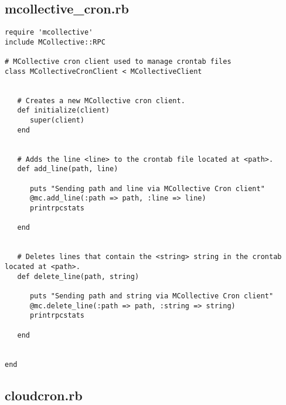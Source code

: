 \subsection{mcollective\_cron.rb}


\begin{lstlisting}
require 'mcollective'
include MCollective::RPC

# MCollective cron client used to manage crontab files
class MCollectiveCronClient < MCollectiveClient
   
   
   # Creates a new MCollective cron client.
   def initialize(client)
      super(client)
   end
   
   
   # Adds the line <line> to the crontab file located at <path>.
   def add_line(path, line)
   
      puts "Sending path and line via MCollective Cron client"
      @mc.add_line(:path => path, :line => line)
      printrpcstats
   
   end
   
   
   # Deletes lines that contain the <string> string in the crontab located at <path>.
   def delete_line(path, string)
   
      puts "Sending path and string via MCollective Cron client"
      @mc.delete_line(:path => path, :string => string)
      printrpcstats
   
   end
   
   
end
\end{lstlisting}


\subsection{cloudcron.rb}


